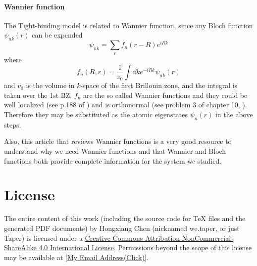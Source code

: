 \documentclass{article}
\begin{document}
\paragraph{Wannier function} The Tight-binding model is related to
Wannier function, since any Bloch function $\psi_{nk}(r)$ can be
expended
\begin{equation}
    \psi_{nk} = \sum_r f_n(r-R) e^{iRk}
\end{equation}
where
\begin{equation}
    f_n(R,r) = \frac{1}{v_0} \int\dd{k}e^{-iRk}\psi_{nk}(r)
\end{equation}
and $v_0$ is the volume in $k$-space of the first Brillouin zone, and
the integral is taken over the 1st BZ. $f_n$ are the so called Wannier
functions and they could be well localized (see p.188 of
\cite{Ashcroft1976}) and is orthonormal (see problem 3 of chapter 10,
\cite{Ashcroft1976}). Therefore they may be substituted as the atomic
eigenstates $\psi_n(r)$ in the above steps.   %

Also, this article \cite{Marzari2012} that reviews Wannier functions
is a very good resource to understand why we need Wannier functions
and that Wannier and Bloch functions both provide complete information
for the system we studied.

{}


\printnomenclature
\section{License}
The entire content of this work (including the source code
for TeX files and the generated PDF documents) by 
Hongxiang Chen (nicknamed we.taper, or just Taper) is
licensed under a 
\href{http://creativecommons.org/licenses/by-nc-sa/4.0/}{Creative 
Commons Attribution-NonCommercial-ShareAlike 4.0 International 
License}. Permissions beyond the scope of this 
license may be available at 
\href{http://www.google.com/recaptcha/mailhide/d?k=015LguzBJigi0rpyuJRqLoig==\&c=p1c-M-mm7ZcjUCkTuZZa9eEPHRVk6paN0694iazlQy8=}
{[My Email Address(Click)]}.
\end{document}
